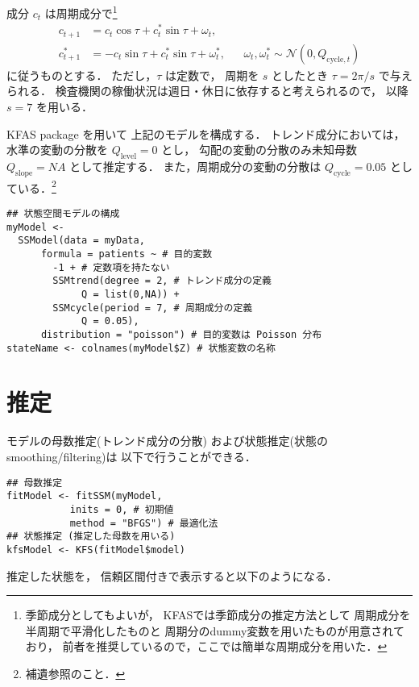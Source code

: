 \documentclass[10pt,oneside,fleqn]{scrartcl}
\begin{document}
成分 \(c_{t}\) は周期成分で\footnote{季節成分としてもよいが，
KFASでは季節成分の推定方法として
周期成分を半周期で平滑化したものと
周期分のdummy変数を用いたものが用意されており，
前者を推奨しているので，ここでは簡単な周期成分を用いた．}
\begin{align}
  c_{t+1}
  &=c_{t}\cos\tau+c^{*}_{t}\sin\tau+\omega_{t},\\
  c^{*}_{t+1}
  &=-c_{t}\sin\tau+c^{*}_{t}\sin\tau+\omega^{*}_{t},
  &&\omega_{t},\omega^{*}_{t}\sim\mathcal{N}(0,Q_{\mathrm{cycle},t})
\end{align}
に従うものとする．
ただし，\(\tau\) は定数で，
周期を \(s\) としたとき
\(\tau=2\pi/s\) で与えられる．
検査機関の稼働状況は週日・休日に依存すると考えられるので，
以降 \(s=7\) を用いる．

KFAS package を用いて
上記のモデルを構成する．
トレンド成分においては，
水準の変動の分散を \(Q_{\mathrm{level}}=0\)
とし，
勾配の変動の分散のみ未知母数 \(Q_{\mathrm{slope}}=NA\) として推定する．
また，周期成分の変動の分散は \(Q_{\mathrm{cycle}}=0.05\) としている．\footnote{補遺参照のこと．}

\begin{verbatim}
## 状態空間モデルの構成
myModel <-
  SSModel(data = myData, 
	  formula = patients ~ # 目的変数
	    -1 + # 定数項を持たない
	    SSMtrend(degree = 2, # トレンド成分の定義
		     Q = list(0,NA)) +
	    SSMcycle(period = 7, # 周期成分の定義
		     Q = 0.05),
	  distribution = "poisson") # 目的変数は Poisson 分布
stateName <- colnames(myModel$Z) # 状態変数の名称 
\end{verbatim}

\section{推定}
\label{sec:org1e983b8}

モデルの母数推定(トレンド成分の分散)
および状態推定(状態のsmoothing/filtering)は
以下で行うことができる．

\begin{verbatim}
## 母数推定
fitModel <- fitSSM(myModel, 
		   inits = 0, # 初期値
		   method = "BFGS") # 最適化法
## 状態推定 (推定した母数を用いる)
kfsModel <- KFS(fitModel$model)
\end{verbatim}

推定した状態を，
信頼区間付きで表示すると以下のようになる．

\begin{figure}[htbp]
  \centering
  \myGraph[1]{}
\end{figure}
\end{document}
